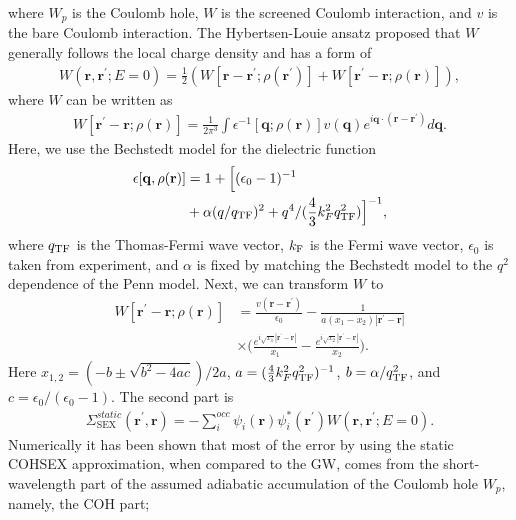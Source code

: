\documentclass[prb,twocolumn,showpacs,preprintnumbers,superscriptaddress,amsmath,amssymb]{revtex4}
\begin{document}
where $W_p$ is the Coulomb hole, $W$ is the screened Coulomb interaction, and $v$ is the bare Coulomb interaction.
The Hybertsen-Louie ansatz\cite{88B-Mark} proposed that $W$ generally follows the local charge density and
has a form of
\begin{align}
W(\mathbf{r},\mathbf{r^{\prime}};E=0)=\frac{1}{2}(W[\mathbf{r}-\mathbf{r^{\prime}};\rho(\mathbf{r}^{\prime})]
+W[\mathbf{r^{\prime}}-\mathbf{r};\rho(\mathbf{r})]),
\end{align}
where $W$ can be written as
\begin{align}
W[\mathbf{r^{\prime}}-\mathbf{r};\rho(\mathbf{r})]=
\frac{1}{2\pi^3}\int\epsilon^{-1}[\mathbf{q};\rho(\mathbf{r})]
v(\mathbf{q})e^{i\mathbf{q}\cdot(\mathbf{r}-\mathbf{r^{\prime}})}d\mathbf{q}.
\end{align}
Here, we use the Bechstedt model\cite{92bechstedt} for the dielectric function
\begin{align}
\epsilon[\mathbf{q},\rho(\mathbf{r})]&=1+\Bigl[(\epsilon_{0}-1)^{-1}\\
&+\alpha(q/q_{\rm{TF}})^2+q^4/(\frac{4}{3}k_{F}^2q_{\rm{TF}}^2)\Bigr]^{-1}, \nonumber
\end{align}
where $q_{\rm{TF}}$ is the Thomas-Fermi wave vector, $k_{\rm{F}}$ is the Fermi wave vector,
$\epsilon_{0}$ is taken from experiment, and $\alpha$ is fixed
by matching the Bechstedt model to the $q^2$ dependence of the Penn model.\cite{penn1962wave}
Next, we can transform $W$ to
\begin{align}
W[\mathbf{r^{\prime}}-\mathbf{r};\rho(\mathbf{r})]&=\frac{v(\mathbf{r}-\mathbf{r^{\prime}})}{\epsilon_{0}}
-\frac{1}{a(x_1-x_2)|\mathbf{r}^{\prime}-\mathbf{r}|}\\
&\times\Big(\frac{e^{i\sqrt{x_1}|\mathbf{r}^{\prime}-\mathbf{r}|}}{x_1}
-\frac{e^{i\sqrt{x_2}|\mathbf{r}^{\prime}-\mathbf{r}|}}{x_2}\Big). \nonumber
\end{align}
Here $x_{1,2}=(-b\pm\sqrt{b^2-4ac})/2a$, $a=(\frac{4}{3}k_{F}^2q_{\rm{TF}}^2)^{-1}$,
$b=\alpha/q_{\rm{TF}}^{2}$, and $c=\epsilon_0/(\epsilon_0-1)$.
The second part is
\begin{align}
\Sigma_{\mathrm{SEX}}^{static}(\mathbf{r}^{\prime},\mathbf{r})=-\sum_{i}^{occ}\psi_{i}(\mathbf{r})
\psi_{i}^{\ast}(\mathbf{r^{\prime}})W(\mathbf{r},\mathbf{r^{\prime}};E=0).
\end{align}
Numerically it has been shown that most of the error by using the static COHSEX approximation, when compared to the GW,
comes from the short-wavelength part of the assumed adiabatic accumulation of the Coulomb hole $W_{p}$, namely, the COH part;
\end{document}
